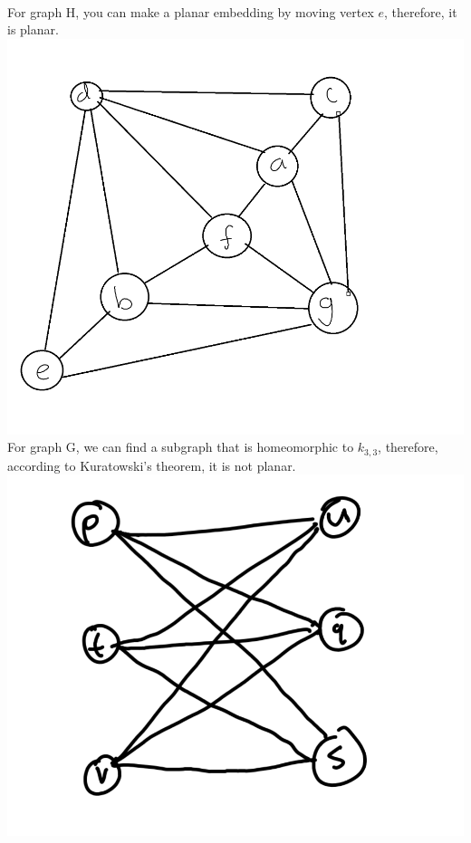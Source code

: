 \documentclass{article}
\begin{document}
\begin{solution}
	\\ For graph H, you can make a planar embedding by moving vertex $e$, therefore, it is planar.
	\\ \includegraphics[scale=0.2]{h.png}
	\\ For graph G, we can find a subgraph that is homeomorphic to $k_{3,3}$, therefore, according to Kuratowski's theorem, it is not planar.
	\\ \includegraphics[scale=0.2]{g.png}
\end{solution}
\end{document}
